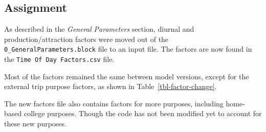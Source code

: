 \documentclass[
  letterpaper,
  DIV=11,
  numbers=noendperiod]{scrreprt}
\begin{document}
\newpage

\hypertarget{assignment}{%
\subsection{Assignment}\label{assignment}}

As described in the \emph{General Parameters} section, diurnal and
production/attraction factors were moved out of the
\texttt{0\_GeneralParameters.block} file to an input file. The factors
are now found in the \texttt{Time\ Of\ Day\ Factors.csv} file.

Most of the factors remained the same between model versions, except for
the external trip purpose factors, as shown in
Table~\ref{tbl-factor-change}.

The new factors file also contains factors for more purposes, including
home-based college purposes. Though the code has not been modified yet
to account for these new purposes.
\end{document}
